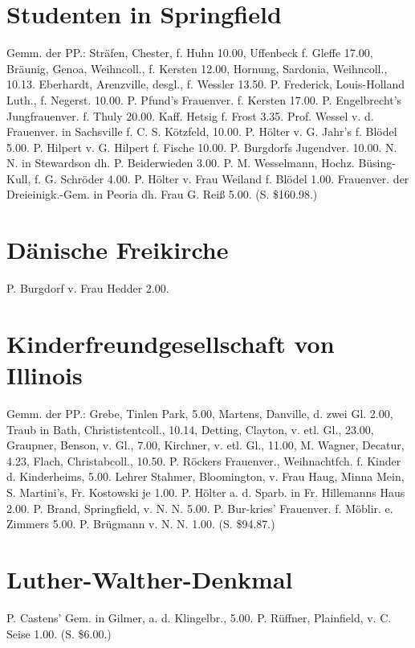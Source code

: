 \section{Studenten in Springfield}

Gemm. der PP.: Sträfen, Chester, f. Huhn 10.00, Uffenbeck f. Gleffe 17.00, Bräunig, Genoa, Weihncoll., f. Kersten 12.00, Hornung, Sardonia, Weihncoll., 10.13. Eberhardt, Arenzville, desgl., f. Wessler 13.50. P. Frederick, Louis-Holland Luth., f. Negerst. 10.00. P. Pfund’s Frauenver. f. Kersten 17.00. P. Engelbrecht’s Jungfrauenver. f. Thuly 20.00. Kaff. Hetsig f. Frost 3.35. Prof. Wessel v. d. Frauenver. in Sachsville f. C. S. Kötzfeld, 10.00. P. Hölter v. G. Jahr’s f. Blödel 5.00. P. Hilpert v. G. Hilpert f. Fische 10.00. P. Burgdorfs Jugendver. 10.00. N. N. in Stewardson dh. P. Beiderwieden 3.00. P. M. Wesselmann, Hochz. Büsing-Kull, f. G. Schröder 4.00. P. Hölter v. Frau Weiland f. Blödel 1.00. Frauenver. der Dreieinigk.-Gem. in Peoria dh. Frau G. Reiß 5.00. (S. \$160.98.)

\section{Dänische Freikirche}

P. Burgdorf v. Frau Hedder 2.00.

\section{Kinderfreundgesellschaft von Illinois}

Gemm. der PP.: Grebe, Tinlen Park, 5.00, Martens, Danville, d. zwei Gl. 2.00, Traub in Bath, Christistentcoll., 10.14, Detting, Clayton, v. etl. Gl., 23.00, Graupner, Benson, v. Gl., 7.00, Kirchner, v. etl. Gl., 11.00, M. Wagner, Decatur, 4.23, Flach, Christabcoll., 10.50. P. Röckers Frauenver., Weihnachtfch. f. Kinder d. Kinderheims, 5.00. Lehrer Stahmer, Bloomington, v. Frau Haug, Minna Mein, S. Martini’s, Fr. Kostowski je 1.00. P. Hölter a. d. Sparb. in Fr. Hillemanns Haus 2.00. P. Brand, Springfield, v. N. N. 5.00. P. Bur-kries’ Frauenver. f. Möblir. e. Zimmers 5.00. P. Brügmann v. N. N. 1.00. (S. \$94.87.)

\section{Luther-Walther-Denkmal}

P. Castens’ Gem. in Gilmer, a. d. Klingelbr., 5.00. P. Rüffner, Plainfield, v. C. Seise 1.00. (S. \$6.00.)

